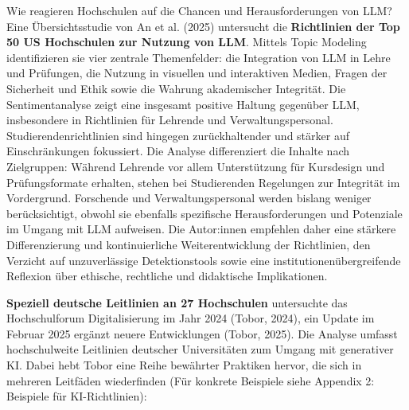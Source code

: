 \documentclass[
  ngerman,
  letterpaper,
  DIV=11]{scrreprt}
\begin{document}
Wie reagieren Hochschulen auf die Chancen und Herausforderungen von LLM?
Eine Übersichtsstudie von An et al. (2025) untersucht die
\textbf{Richtlinien der Top 50 US Hochschulen zur Nutzung von LLM}.
Mittels Topic Modeling identifizieren sie vier zentrale Themenfelder:
die Integration von LLM in Lehre und Prüfungen, die Nutzung in visuellen
und interaktiven Medien, Fragen der Sicherheit und Ethik sowie die
Wahrung akademischer Integrität. Die Sentimentanalyse zeigt eine
insgesamt positive Haltung gegenüber LLM, insbesondere in Richtlinien
für Lehrende und Verwaltungspersonal. Studierendenrichtlinien sind
hingegen zurückhaltender und stärker auf Einschränkungen fokussiert. Die
Analyse differenziert die Inhalte nach Zielgruppen: Während Lehrende vor
allem Unterstützung für Kursdesign und Prüfungsformate erhalten, stehen
bei Studierenden Regelungen zur Integrität im Vordergrund. Forschende
und Verwaltungspersonal werden bislang weniger berücksichtigt, obwohl
sie ebenfalls spezifische Herausforderungen und Potenziale im Umgang mit
LLM aufweisen. Die Autor:innen empfehlen daher eine stärkere
Differenzierung und kontinuierliche Weiterentwicklung der Richtlinien,
den Verzicht auf unzuverlässige Detektionstools sowie eine
institutionenübergreifende Reflexion über ethische, rechtliche und
didaktische Implikationen.

\textbf{Speziell deutsche Leitlinien an 27 Hochschulen} untersuchte das
Hochschulforum Digitalisierung im Jahr 2024 (Tobor, 2024), ein Update im
Februar 2025 ergänzt neuere Entwicklungen (Tobor, 2025). Die Analyse
umfasst hochschulweite Leitlinien deutscher Universitäten zum Umgang mit
generativer KI. Dabei hebt Tobor eine Reihe bewährter Praktiken hervor,
die sich in mehreren Leitfäden wiederfinden (Für konkrete Beispiele
siehe Appendix 2: Beispiele für KI-Richtlinien):
\end{document}
